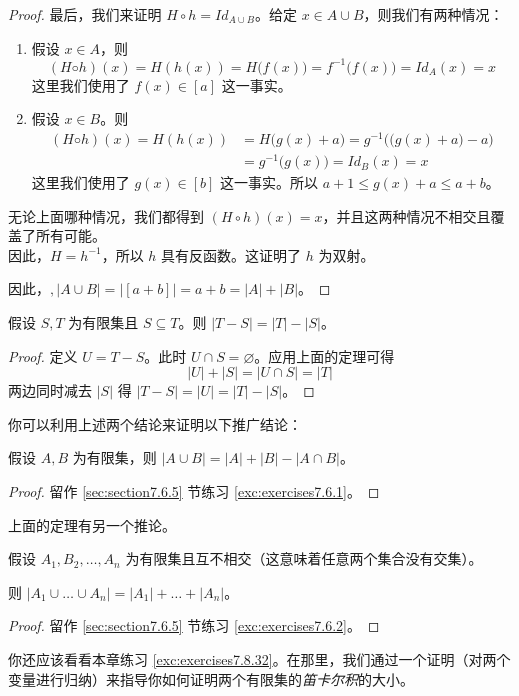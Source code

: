 \begin{proof}
    最后，我们来证明 $H \circ h = Id_{A \cup B}$。给定 $x \in A \cup B$，则我们有两种情况：
    \begin{enumerate}[label=(\arabic*)]
        \item 假设 $x \in A$，则
            \[(H ◦ h)(x) = H(h(x)) = H\big(f(x)\big) = f^{-1}\big(f(x)\big) = Id_A(x) = x\]
            这里我们使用了 $f(x) \in [a]$ 这一事实。
        \item 假设 $x \in B$。则
        \begin{align*}
            (H ◦ h)(x) = H(h(x)) &= H\big(g(x)+a\big) = g^{-1}\Big(\big(g(x)+a\big)-a\Big)\\
            &= g^{-1}\big(g(x)\big) = Id_B(x) = x
        \end{align*}
            这里我们使用了 $g(x) \in [b]$ 这一事实。所以 $a + 1 \le g(x) + a \le a + b$。
    \end{enumerate}
    无论上面哪种情况，我们都得到 $(H \circ h)(x) = x$，并且这两种情况不相交且覆盖了所有可能。\\

    因此，$H = h^{-1}$，所以 $h$ 具有反函数。这证明了 $h$ 为双射。

    因此，$, |A \cup B| = |[a + b]| = a + b = |A| + |B|$。
\end{proof}

\begin{corollary}
    假设 $S,T$ 为有限集且 $S \subseteq T$。则 $|T-S| = |T|-|S|$。
\end{corollary}

\begin{proof}
    定义 $U = T - S$。此时 $U \cap S = \varnothing$。应用上面的定理可得
    \[|U| + |S| = |U \cap S| = |T|\]
    两边同时减去 $|S|$ 得 $ |T - S| = |U| = |T| - |S|$。
\end{proof}

你可以利用上述两个结论来证明以下推广结论：

\begin{proposition}\label{prop:proposition7.6.9}
    假设 $A,B$ 为有限集，则 $|A \cup B| = |A| + |B| - |A \cap B|$。
\end{proposition}

\begin{proof}
    留作 \ref{sec:section7.6.5} 节练习 \ref{exc:exercises7.6.1}。
\end{proof}

上面的定理有另一个推论。

\begin{corollary}\label{corollary7.6.10}
    假设 $A_1,B_2,\dots,A_n$ 为有限集且互不相交（这意味着任意两个集合没有交集）。

    则 $|A_1 \cup \dots \cup A_n| = |A_1| + \dots + |A_n|$。
\end{corollary}

\begin{proof}
    留作 \ref{sec:section7.6.5} 节练习 \ref{exc:exercises7.6.2}。
\end{proof}

你还应该看看本章练习 \ref{exc:exercises7.8.32}。在那里，我们通过一个证明（对两个变量进行归纳）来指导你如何证明两个有限集的\emph{笛卡尔积}的大小。